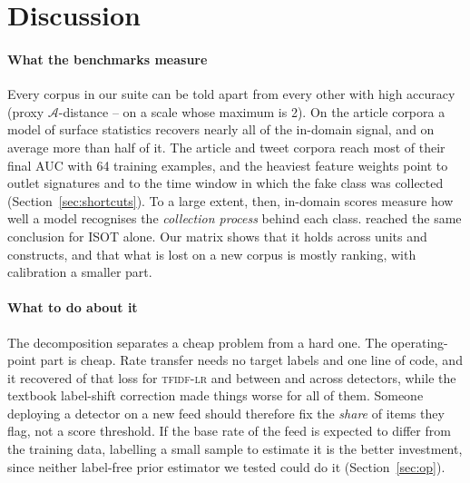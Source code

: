 \section{Discussion}\label{sec:discussion}

\paragraph{What the benchmarks measure}
Every corpus in our suite can be told apart from every other with high accuracy (proxy $\mathcal{A}$-distance \PADmin--\PADmax{} on a scale whose maximum is 2). On the article corpora a model of surface statistics recovers nearly all of the in-domain signal, and on average more than half of it. The article and tweet corpora reach most of their final AUC with 64 training examples, and the heaviest feature weights point to outlet signatures and to the time window in which the fake class was collected (Section~\ref{sec:shortcuts}). To a large extent, then, in-domain scores measure how well a model recognises the \emph{collection process} behind each class. \citet{verma2026audit} reached the same conclusion for ISOT alone. Our matrix shows that it holds across units and constructs, and that what is lost on a new corpus is mostly ranking, with calibration a smaller part.

\paragraph{What to do about it}
The decomposition separates a cheap problem from a hard one. The operating-point part is cheap. Rate transfer needs no target labels and one line of code, and it recovered \RecRank{} of that loss for \textsc{tfidf-lr} and between \RecRankMin{} and \RecRankMax{} across detectors, while the textbook label-shift correction made things worse for all of them. Someone deploying a detector on a new feed should therefore fix the \emph{share} of items they flag, not a score threshold. If the base rate of the feed is expected to differ from the training data, labelling a small sample to estimate it is the better investment, since neither label-free prior estimator we tested could do it (Section~\ref{sec:op}).

